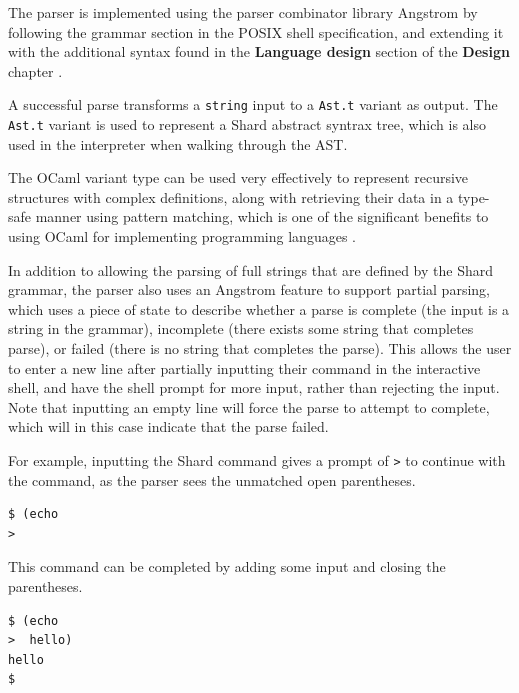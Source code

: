 \documentclass[twoside]{report}
\begin{document}
The parser is implemented using the parser combinator library Angstrom by following the grammar section in the POSIX shell specification, and extending it with the additional syntax found in the \textbf{Language design} section of the \textbf{Design} chapter \cite{ocamlangstrom} \cite{posix2017}.

A successful parse transforms a \texttt{string} input to a \texttt{Ast.t} variant as output. The \texttt{Ast.t} variant is used to represent a Shard abstract syntrax tree, which is also used in the interpreter when walking through the AST.

The OCaml variant type can be used very effectively to represent recursive structures with complex definitions, along with retrieving their data in a type-safe manner using pattern matching, which is one of the significant benefits to using OCaml for implementing programming languages \cite{realworldocaml}.

In addition to allowing the parsing of full strings that are defined by the Shard grammar, the parser also uses an Angstrom feature to support partial parsing, which uses a piece of state to describe whether a parse is complete (the input is a string in the grammar), incomplete (there exists some string that completes parse), or failed (there is no string that completes the parse).
This allows the user to enter a new line after partially inputting their command in the interactive shell, and have the shell prompt for more input, rather than rejecting the input.
Note that inputting an empty line will force the parse to attempt to complete, which will in this case indicate that the parse failed.

For example, inputting the Shard command gives a prompt of \texttt{>} to continue with the command, as the parser sees the unmatched open parentheses.

\begin{minipage}[c]{\textwidth-15pt}
  \begin{lstlisting}[language=shard]
$ (echo
>
\end{lstlisting}
  \smallskip
\end{minipage}

This command can be completed by adding some input and closing the parentheses.

\begin{minipage}[c]{\textwidth-15pt}
  \begin{lstlisting}[language=shard]
$ (echo
>  hello)
hello
$
\end{lstlisting}
  \smallskip
\end{minipage}
\end{document}
